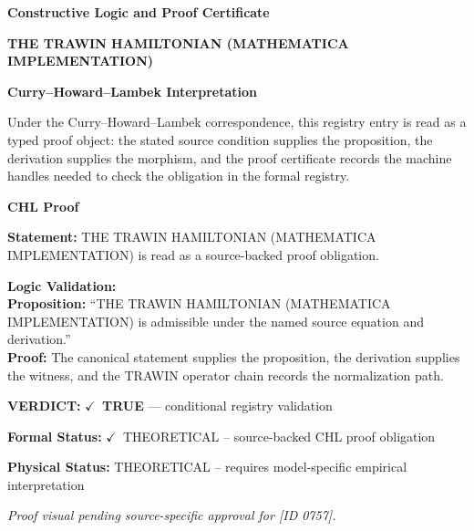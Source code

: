 \clearpage
\begingroup\tzpsupportsetup
\noindent\textbf{\fontsize{10.8pt}{12.8pt}\selectfont [ID 0757] Constructive Logic and Proof Certificate}\par
\noindent\textbf{\fontsize{10pt}{12pt}\selectfont THE TRAWIN HAMILTONIAN (MATHEMATICA IMPLEMENTATION)}\par
\vspace{0.45em}
\begingroup
\footnotesize
\setlength{\parskip}{0.22em}
\setlength{\parindent}{0pt}
\noindent\textbf{Curry--Howard--Lambek Interpretation}\par
Under the Curry--Howard--Lambek correspondence, this registry entry is read as a typed proof
object: the stated source condition supplies the proposition, the derivation supplies the
morphism, and the proof certificate records the machine handles needed to check the obligation
in the formal registry.

\vspace{0.45em}
\noindent\textbf{CHL Proof}\par
\textbf{Statement:} THE TRAWIN HAMILTONIAN (MATHEMATICA IMPLEMENTATION) is read as a source-backed proof obligation.

\textbf{Logic Validation:}\\
\textbf{Proposition:} ``THE TRAWIN HAMILTONIAN (MATHEMATICA IMPLEMENTATION) is admissible under the named source equation and derivation.''\\
\textbf{Proof:} The canonical statement supplies the proposition, the derivation supplies the witness, and the TRAWIN operator chain records the normalization path.

\textbf{VERDICT:} \ensuremath{\checkmark}\ \textbf{TRUE} --- conditional registry validation

\textbf{Formal Status:} \ensuremath{\checkmark}\ THEORETICAL -- source-backed CHL proof obligation

\textbf{Physical Status:} THEORETICAL -- requires model-specific empirical interpretation
\par\vspace{0.45em}
\par
\vfill
\begingroup\footnotesize\itshape
Proof visual pending source-specific approval for [ID 0757].
\par\endgroup
\vfill
\endgroup
\endgroup
